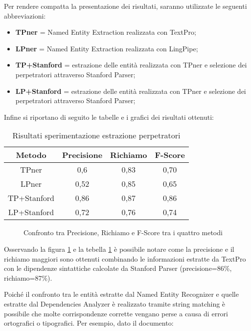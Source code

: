 Per rendere compatta la presentazione dei risultati, saranno utilizzate le seguenti abbreviazioni:
\begin{itemize}
\item \textbf{TPner} = Named Entity Extraction realizzata con TextPro;
\item \textbf{LPner} = Named Entity Extraction realizzata con LingPipe;
\item \textbf{TP+Stanford} = estrazione delle entità realizzata con TPner e selezione dei perpetratori attraverso Stanford Parser;
\item \textbf{LP+Stanford} = estrazione delle entità realizzata con TPner e selezione dei perpetratori attraverso Stanford Parser;
\end{itemize}
Infine si riportano di seguito le tabelle e i grafici dei risultati ottenuti:
\begin{table}[H]
	\centering
	\footnotesize
	\begin{tabular}{|cccc|}
	\hline
	\textbf{Metodo}  & \textbf{Precisione} & \textbf{Richiamo} & \textbf{F-Score} \\ \hline
	TPner & 0,6 & 0,83 & 0,70\\ 
	LPner & 0,52 & 0,85 & 0,65\\ 
	TP+Stanford & 0,86 & 0,87 & 0,86\\ 
	LP+Stanford & 0,72 & 0,76 & 0,74\\ 
	\hline
	\end{tabular}
	\caption{Risultati sperimentazione estrazione perpetratori}
	\label{tabConfrontoRis}
\end{table}
\begin{figure}[H]
\centering
{}\qquad
{}
\qquad
\caption{Confronto tra Precisione, Richiamo e F-Score tra i quattro metodi}
\label{figConfrontoRis}
\end{figure}
Osservando la figura \ref{figConfrontoRis} e la tebella \ref{tabConfrontoRis} è possibile notare come la precisione e il richiamo maggiori sono ottenuti combinando le informazioni estratte da TextPro con le dipendenze sintattiche calcolate da Stanford Parser (precisione=86\%, richiamo=87\%).

Poiché il confronto tra le entità estratte dal Named Entity Recognizer e quelle estratte dal Dependencies Analyzer è realizzato tramite string matching è possibile che molte corrispondenze corrette vengano perse a causa di errori ortografici o tipografici.
Per esempio, dato il documento:

